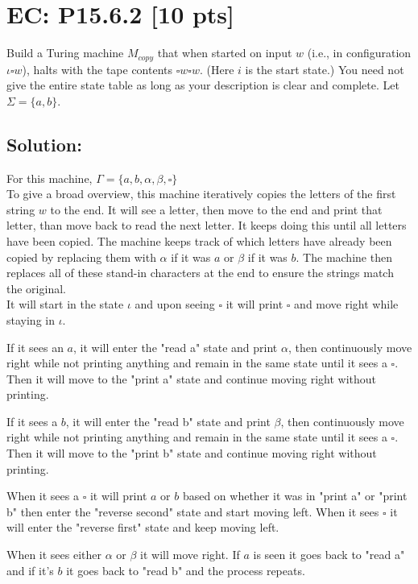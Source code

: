 \documentclass[12pt]{article}
\begin{document}
\newpage
\section*{\textbf{EC: P15.6.2} [10 pts]}
Build a Turing machine $M_{copy}$ that when started on input $w$ (i.e., in configuration $\iota \square w$), halts with the tape contents $\square w \square w$. (Here $i$ is the start state.) You need not give the entire state table as long as your description is clear and complete. Let $\Sigma = \{a, b\}$.

\subsection*{\textbf{Solution:}}
For this machine, $\Gamma = \{ a, b, \alpha, \beta, \square \} $ \\

To give a broad overview, this machine iteratively copies the letters of the first string $w$ to the end. It will see a letter, then move to the end and print that letter, than move back to read the next letter. It keeps doing this until all letters have been copied. The machine keeps track of which letters have already been copied by replacing them with $\alpha$ if it was $a$ or $\beta$ if it was $b$. The machine then replaces all of these stand-in characters at the end to ensure the strings match the original. \\

It will start in the state $\iota$ and upon seeing $\square$ it will print $\square$ and move right while staying in $\iota$.

If it sees an $a$, it will enter the "read a" state and print $\alpha$, then continuously move right while not printing anything and remain in the same state until it sees a $\square$. Then it will move to the "print a" state and continue moving right without printing. 

If it sees a $b$, it will enter the "read b" state and print $\beta$, then continuously move right while not printing anything and remain in the same state until it sees a $\square$. Then it will move to the "print b" state and continue moving right without printing. 

When it sees a $\square$ it will print $a$ or $b$ based on whether it was in "print a" or "print b" then enter the "reverse second" state and start moving left. When it sees $\square$ it will enter the "reverse first" state and keep moving left. 

When it sees either $\alpha$ or $\beta$ it will move right. If $a$ is seen it goes back to "read a" and if it's $b$ it goes back to "read b" and the process repeats.
\end{document}
